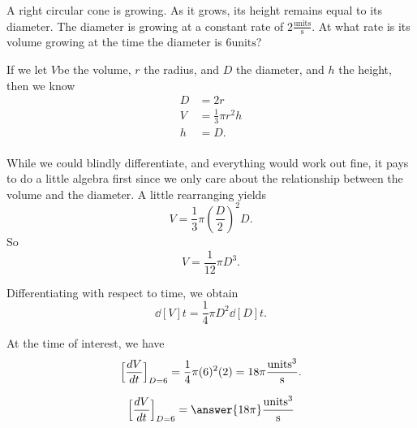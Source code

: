 \documentclass{ximera}
\author{Steven Gubkin}
\begin{document}
\begin{exercise}

A right circular cone is growing.  As it grows, its height remains
equal to its diameter. The diameter is growing at a constant rate of
$2 \frac{\textrm{units}}{\textrm{s}}$. At what rate is its volume
growing at the time the diameter is $6 \textrm{units}$?


\begin{hint}
  If we let $V$be the volume, $r$ the radius, and $D$ the diameter,  and $h$ the height, then we know
\begin{align*}
	D &= 2r\\
	V &= \frac{1}{3} \pi r^2 h\\
	h &= D.\\
\end{align*}
\end{hint}

\begin{hint}
  While we could blindly differentiate, and everything would work out
  fine, it pays to do a little algebra first since we only care about
  the relationship between the volume and the diameter.  A little
  rearranging yields
\[
V = \frac{1}{3} \pi \left(\frac{D}{2}\right)^2D.
\]
So
\[
V = \frac{1}{12} \pi D^3.
\]
\end{hint}

\begin{hint}
  Differentiating with respect to time, we obtain
  \[
  \dd[V]{t} = \frac{1}{4} \pi D^2 \dd[D]{t}.
  \]
\end{hint}

\begin{hint}
  At the time of interest, we have
  \[
 \Bigl[ \dd[V]{t} \Bigr]_{D=6}= \frac{1}{4} \pi (6)^2 (2) = 18\pi\frac{\textrm{units}^3}{\textrm{s}}.
  \]
\end{hint}

\begin{prompt}
  \[
 \Bigl[ \dd[V]{t} \Bigr]_{D=6} = \answer{18\pi}\frac{\textrm{units}^3}{\textrm{s}}
  \]
\end{prompt}

\end{exercise}
\end{document}
